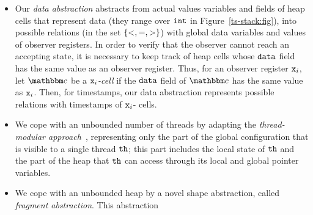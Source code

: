 \begin{itemize}
  \item
    Our {\em data abstraction} abstracts from actual values variables and
    fields of heap cells that represent data (they range over $\tt int$
    in Figure~\ref{ts-stack:fig}),
    into possible relations
    (in the set $\left\{<,=,>\right\}$) with global data variables and values of
    observer registers. 
    In order to verify that the observer cannot reach an accepting state,
    it is necessary to
    keep track of heap cells whose ${\tt data}$ field has the same value as an
    observer register. Thus, 
    for an observer register $\mathtt{x}_i$, let $\cell$ be a {\em $\mathtt{x}_i$-cell} if
    the ${\tt data}$ field of $\cell$ has the same value as $\mathtt{x}_i$.
    Then, for timestamps, our data abstraction represents
    possible relations with timestamps of $\mathtt{x}_i$- cells.
  \item
We cope with an unbounded number of threads by
adapting the {\em thread-modular approach}~\cite{BLMRS:cav08},
representing only the part of the global configuration that is visible to
a single thread ${\tt th}$; this part includes the local state of ${\tt th}$ and
the part of the heap that ${\tt th}$ can access through its local
and global pointer variables.
\item
  We cope with an unbounded heap by a novel shape abstraction, 
called {\em fragment abstraction}. This abstraction 

\end{itemize}
